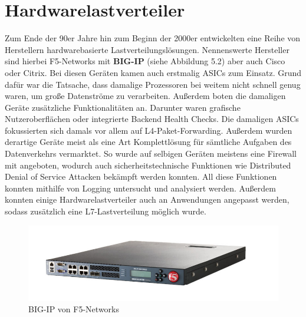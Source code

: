 \section{Hardwarelastverteiler}
Zum Ende der 90er Jahre hin zum Beginn der 2000er entwickelten eine Reihe von Herstellern hardwarebasierte Lastverteilungslösungen. Nennenswerte Hersteller sind hierbei F5-Networks mit \textbf{BIG-IP} (siehe Abbildung 5.2) aber auch Cisco oder Citrix. Bei diesen Geräten kamen auch erstmalig ASICs zum Einsatz. Grund dafür war die Tatsache, dass damalige Prozessoren bei weitem nicht schnell genug waren, um große Datenströme zu verarbeiten. Außerdem boten die damaligen Geräte zusätzliche Funktionalitäten an. Darunter waren grafische Nutzeroberflächen oder integrierte Backend Health Checks. \cite{bigip} Die damaligen ASICs fokussierten sich damals vor allem auf L4-Paket-Forwarding. Außerdem wurden derartige Geräte meist als eine Art Komplettlösung für sämtliche Aufgaben des Datenverkehrs vermarktet. So wurde auf selbigen Geräten meistens eine Firewall mit angeboten, wodurch auch sicherheitstechnische Funktionen wie Distributed Denial of Service Attacken bekämpft werden konnten. All diese Funktionen konnten mithilfe von Logging untersucht und analysiert werden. Außerdem konnten einige Hardwarelastverteiler auch an Anwendungen angepasst werden, sodass zusätzlich eine L7-Lastverteilung möglich wurde.
\begin{figure}
    \centering
    \includegraphics[width=1\linewidth]{images/s-l1600.jpg}
    \caption{BIG-IP von F5-Networks}
    \label{fig:enter-label}
\end{figure}
